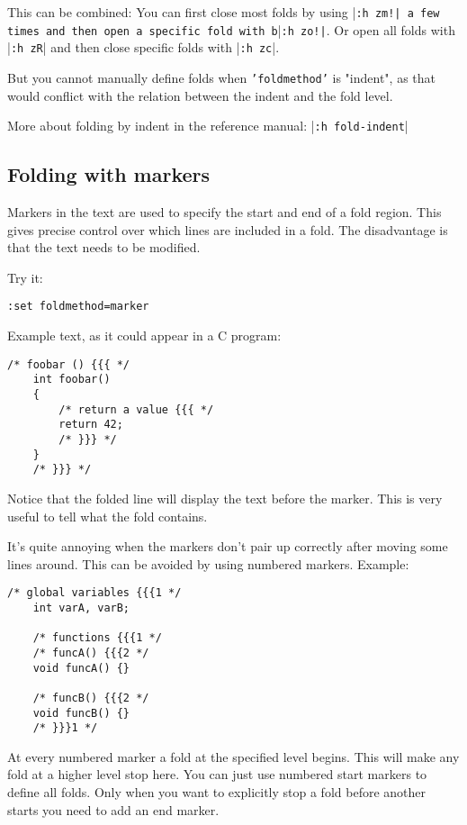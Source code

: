 This can be combined: You can first close most folds by using |\texttt{:h zm!| a few times and then open a specific fold with b}|\texttt{:h zo!|}.
Or open all folds with |\texttt{:h zR}| and then close specific folds with |\texttt{:h zc}|.

But you cannot manually define folds when \texttt{'foldmethod'} is "indent", as that would conflict with the relation between the indent and the fold level.

More about folding by indent in the reference manual: |\texttt{:h fold-indent}|
\subsection{Folding with markers}
Markers in the text are used to specify the start and end of a fold region.
This gives precise control over which lines are included in a fold.
The disadvantage is that the text needs to be modified.

Try it:

\begin{Verbatim}[samepage=true]
 :set foldmethod=marker
\end{Verbatim}

Example text, as it could appear in a C program:

\begin{Verbatim}[samepage=true]
    /* foobar () {{{ */
    int foobar()
    {
        /* return a value {{{ */
        return 42;
        /* }}} */
    }
    /* }}} */
\end{Verbatim}

Notice that the folded line will display the text before the marker.
This is very useful to tell what the fold contains.

It's quite annoying when the markers don't pair up correctly after moving some lines around.
This can be avoided by using numbered markers.
Example:

\begin{Verbatim}[samepage=true]
    /* global variables {{{1 */
    int varA, varB;

    /* functions {{{1 */
    /* funcA() {{{2 */
    void funcA() {}

    /* funcB() {{{2 */
    void funcB() {}
    /* }}}1 */
\end{Verbatim}

At every numbered marker a fold at the specified level begins.
This will make any fold at a higher level stop here.
You can just use numbered start markers to define all folds.
Only when you want to explicitly stop a fold before another starts you need to add an end marker.

